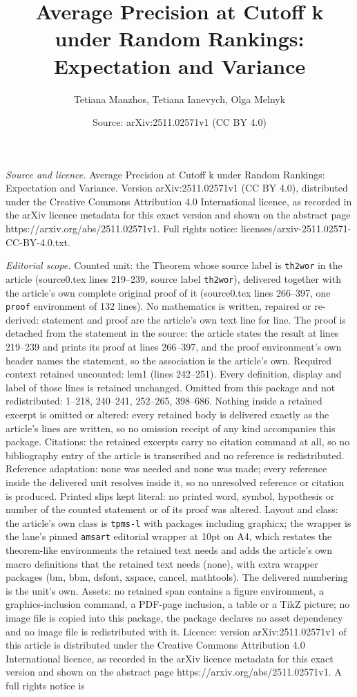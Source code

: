 \documentclass[10pt,a4paper]{amsart}
\title[Average Precision at Cutoff k under Random Rankings: Expecta]{Average Precision at Cutoff k under Random Rankings: Expectation and Variance}
\author{Tetiana Manzhos, Tetiana Ianevych, Olga Melnyk}
\date{Source: arXiv:2511.02571v1 (CC BY 4.0)}
\begin{document}
\maketitle

\noindent\emph{Source and licence.} Average Precision at Cutoff k under Random Rankings: Expectation and Variance. Version arXiv:2511.02571v1 (CC BY 4.0), distributed under the Creative Commons Attribution 4.0 International licence, as recorded in the arXiv licence metadata for this exact version and shown on the abstract page https://arxiv.org/abs/2511.02571v1. Full rights notice: licenses/arxiv-2511.02571-CC-BY-4.0.txt.\par\smallskip

\noindent\textit{Editorial scope.} Counted unit: the Theorem whose source label is \texttt{th2wor} in the article (source0.tex lines 219--239, source label \texttt{th2wor}), delivered together with the article's own complete original proof of it (source0.tex lines 266--397, one \texttt{proof} environment of 132 lines). No mathematics is written, repaired or re-derived: statement and proof are the article's own text line for line. The proof is detached from the statement in the source: the article states the result at lines 219--239 and prints its proof at lines 266--397, and the proof environment's own header names the statement, so the association is the article's own. Required context retained uncounted: lem1 (lines 242--251). Every definition, display and label of those lines is retained unchanged. Omitted from this package and not redistributed: 1--218, 240--241, 252--265, 398--686. Nothing inside a retained excerpt is omitted or altered: every retained body is delivered exactly as the article's lines are written, so no omission receipt of any kind accompanies this package. Citations: the retained excerpts carry no citation command at all, so no bibliography entry of the article is transcribed and no reference is redistributed. Reference adaptation: none was needed and none was made; every reference inside the delivered unit resolves inside it, so no unresolved reference or citation is produced. Printed slips kept literal: no printed word, symbol, hypothesis or number of the counted statement or of its proof was altered. Layout and class: the article's own class is \texttt{tpms-l} with packages including graphicx; the wrapper is the lane's pinned \texttt{amsart} editorial wrapper at 10pt on A4, which restates the theorem-like environments the retained text needs and adds the article's own macro definitions that the retained text needs (none), with extra wrapper packages (bm, bbm, dsfont, xspace, cancel, mathtools). The delivered numbering is the unit's own. Assets: no retained span contains a figure environment, a graphics-inclusion command, a PDF-page inclusion, a table or a TikZ picture; no image file is copied into this package, the package declares no asset dependency and no image file is redistributed with it. Licence: version arXiv:2511.02571v1 of this article is distributed under the Creative Commons Attribution 4.0 International licence, as recorded in the arXiv licence metadata for this exact version and shown on the abstract page https://arxiv.org/abs/2511.02571v1. A full rights notice is 
\end{document}
